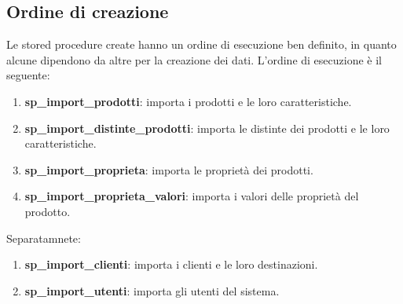 \documentclass[12pt, a4paper]{article}
\begin{document}
\subsection{Ordine di creazione}
Le stored procedure create hanno un ordine di esecuzione ben definito, in quanto alcune dipendono da altre per la creazione dei dati.
L'ordine di esecuzione è il seguente:
\begin{enumerate}
    \item \textbf{sp\_import\_prodotti}: importa i prodotti e le loro caratteristiche.
    \item \textbf{sp\_import\_distinte\_prodotti}: importa le distinte dei prodotti e le loro caratteristiche.
    \item \textbf{sp\_import\_proprieta}: importa le proprietà dei prodotti.
    \item \textbf{sp\_import\_proprieta\_valori}: importa i valori delle proprietà del prodotto.
\end{enumerate}

Separatamnete:
\begin{enumerate}
    \item \textbf{sp\_import\_clienti}: importa i clienti e le loro destinazioni.
    \item \textbf{sp\_import\_utenti}: importa gli utenti del sistema.
\end{enumerate}
\end{document}
